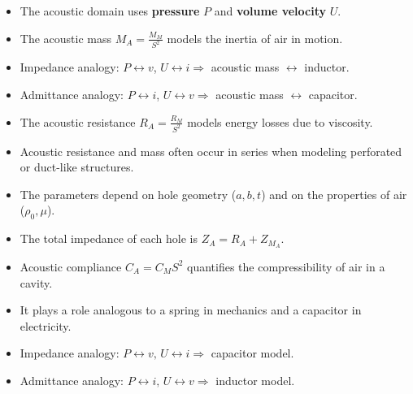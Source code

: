 \begin{tcolorbox}[colback=gray!10!white,colframe=black,title=\textbf{Summary – Acoustic Mass}]
\begin{itemize}
    \item The acoustic domain uses \textbf{pressure} \( P \) and \textbf{volume velocity} \( U \).
    \item The acoustic mass \( M_A = \frac{M_M}{S^2} \) models the inertia of air in motion.
    \item Impedance analogy: \( P \leftrightarrow v \), \( U \leftrightarrow i \Rightarrow \) acoustic mass $\leftrightarrow$ inductor.
    \item Admittance analogy: \( P \leftrightarrow i \), \( U \leftrightarrow v \Rightarrow \) acoustic mass $\leftrightarrow$ capacitor.
\end{itemize}
\end{tcolorbox}


\begin{tcolorbox}[colback=gray!10!white,colframe=black,title=\textbf{Summary – Acoustic Resistance}]
\begin{itemize}
    \item The acoustic resistance \( R_A = \frac{R_M}{S^2} \) models energy losses due to viscosity.
    \item Acoustic resistance and mass often occur in series when modeling perforated or duct-like structures.
    \item The parameters depend on hole geometry (\( a, b, t \)) and on the properties of air (\( \rho_0, \mu \)).
    \item The total impedance of each hole is \( Z_A = R_A + Z_{M_A} \).
\end{itemize}
\end{tcolorbox}


\begin{tcolorbox}[colback=gray!10!white,colframe=black,title=\textbf{Summary – Acoustic Compliance}]
\begin{itemize}
    \item Acoustic compliance \( C_A = C_M S^2 \) quantifies the compressibility of air in a cavity.
    \item It plays a role analogous to a spring in mechanics and a capacitor in electricity.
    \item Impedance analogy: \( P \leftrightarrow v, \, U \leftrightarrow i \Rightarrow \) capacitor model.
    \item Admittance analogy: \( P \leftrightarrow i, \, U \leftrightarrow v \Rightarrow \) inductor model.
\end{itemize}
\end{tcolorbox}


